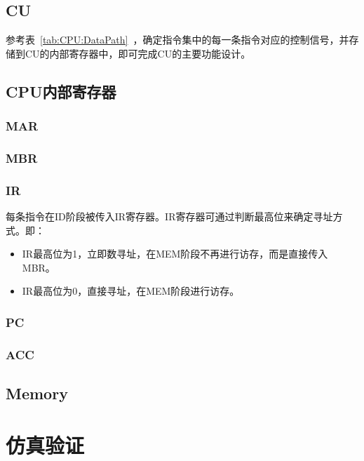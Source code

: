 \documentclass[lang=cn,a4paper,newtx]{elegantpaper}
\begin{document}
\subsection{CU}
参考表~\ref{tab:CPU:DataPath}~，确定指令集中的每一条指令对应的控制信号，并存储到CU的内部寄存器中，即可完成CU的主要功能设计。


\subsection{CPU内部寄存器}
\subsubsection{MAR}
\subsubsection{MBR}
\subsubsection{IR}
每条指令在ID阶段被传入IR寄存器。IR寄存器可通过判断最高位来确定寻址方式。即：
\begin{itemize}
  \item IR最高位为1，立即数寻址，在MEM阶段不再进行访存，而是直接传入MBR。
  \item IR最高位为0，直接寻址，在MEM阶段进行访存。
\end{itemize}

\subsubsection{PC}

\subsubsection{ACC}
\subsection{Memory}




\section{仿真验证}
\end{document}
